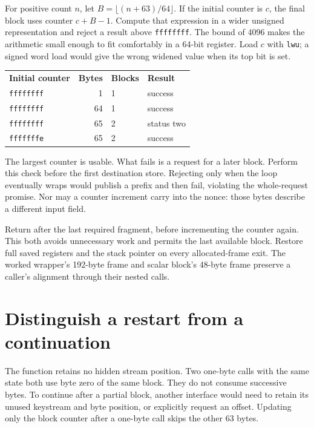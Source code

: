 For positive count $n$, let $B=\lfloor(n+63)/64\rfloor$. If the initial
counter is $c$, the final block uses counter $c+B-1$. Compute that expression
in a wider unsigned representation and reject a result above
\texttt{ffffffff}. The bound of 4096 makes the arithmetic small enough to fit
comfortably in a 64-bit register. Load $c$ with \texttt{lwu}; a signed word
load would give the wrong widened value when its top bit is set.

\begin{center}
  \begin{tabular}{lrll}
    \textbf{Initial counter} & \textbf{Bytes} & \textbf{Blocks} & \textbf{Result} \\
    \texttt{ffffffff}        & 1              & 1               & success         \\
    \texttt{ffffffff}        & 64             & 1               & success         \\
    \texttt{ffffffff}        & 65             & 2               & status two      \\
    \texttt{fffffffe}        & 65             & 2               & success
  \end{tabular}
\end{center}

The largest counter is usable. What fails is a request for a later block.
Perform this check before the first destination store. Rejecting only when the
loop eventually wraps would publish a prefix and then fail, violating the
whole-request promise. Nor may a counter increment carry into the nonce: those
bytes describe a different input field.

Return after the last required fragment, before incrementing the counter again.
This both avoids unnecessary work and permits the last available block.
Restore full saved registers and the stack pointer on every allocated-frame
exit. The worked wrapper's 192-byte frame and scalar block's 48-byte frame
preserve a caller's alignment through their nested calls.

\section{Distinguish a restart from a continuation}

The function retains no hidden stream position. Two one-byte calls with the
same state both use byte zero of the same block. They do not consume successive
bytes. To continue after a partial block, another interface would need to retain
its unused keystream and byte position, or explicitly request an offset.
Updating only the block counter after a one-byte call skips the other 63 bytes.

